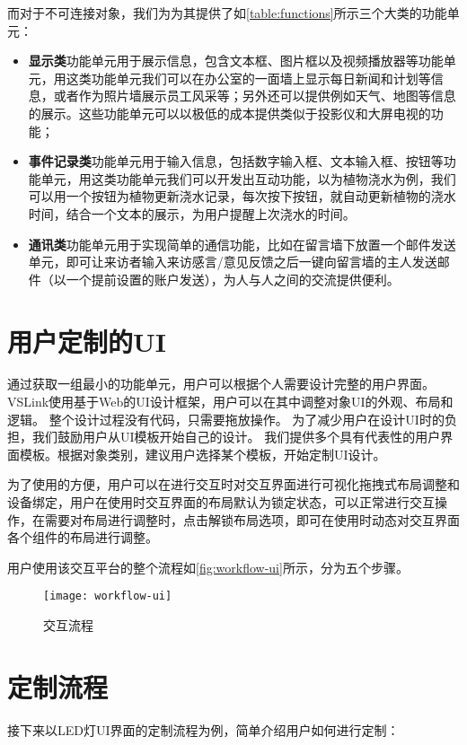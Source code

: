 而对于不可连接对象，我们为为其提供了如\autoref{table:functions}所示三个大类的功能单元：

\begin{itemize}
	\item \textbf{显示类}功能单元用于展示信息，包含文本框、图片框以及视频播放器等功能单元，用这类功能单元我们可以在办公室的一面墙上显示每日新闻和计划等信息，或者作为照片墙展示员工风采等；另外还可以提供例如天气、地图等信息的展示。这些功能单元可以以极低的成本提供类似于投影仪和大屏电视的功能；
	\item \textbf{事件记录类}功能单元用于输入信息，包括数字输入框、文本输入框、按钮等功能单元，用这类功能单元我们可以开发出互动功能，以为植物浇水为例，我们可以用一个按钮为植物更新浇水记录，每次按下按钮，就自动更新植物的浇水时间，结合一个文本的展示，为用户提醒上次浇水的时间。
	\item \textbf{通讯类}功能单元用于实现简单的通信功能，比如在留言墙下放置一个邮件发送单元，即可让来访者输入来访感言/意见反馈之后一键向留言墙的主人发送邮件（以一个提前设置的账户发送），为人与人之间的交流提供便利。
\end{itemize}


 
\section{用户定制的UI}
通过获取一组最小的功能单元，用户可以根据个人需要设计完整的用户界面。
VSLink使用基于Web的UI设计框架，用户可以在其中调整对象UI的外观、布局和逻辑。
整个设计过程没有代码，只需要拖放操作。
为了减少用户在设计UI时的负担，我们鼓励用户从UI模板开始自己的设计。
我们提供多个具有代表性的用户界面模板。根据对象类别，建议用户选择某个模板，开始定制UI设计。

为了使用的方便，用户可以在进行交互时对交互界面进行可视化拖拽式布局调整和设备绑定，用户在使用时交互界面的布局默认为锁定状态，可以正常进行交互操作，在需要对布局进行调整时，点击解锁布局选项，即可在使用时动态对交互界面各个组件的布局进行调整。

用户使用该交互平台的整个流程如\autoref{fig:workflow-ui}所示，分为五个步骤。

\begin{figure}[htbp]
	\centering
	\texttt{[image: workflow-ui]}
	\caption{交互流程}
	\label{fig:workflow-ui}
\end{figure}

\section{定制流程}
接下来以LED灯UI界面的定制流程为例，简单介绍用户如何进行定制：
